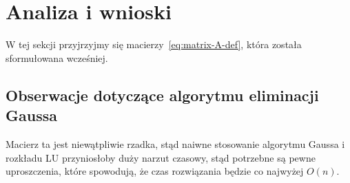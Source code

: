 \documentclass[../analysis.tex]{subfiles}
\begin{document}
  \section{Analiza i wnioski}

  W tej sekcji przyjrzyjmy się macierzy~\ref{eq:matrix-A-def}, 
  która została sformułowana wcześniej.

  \subsection{Obserwacje dotyczące algorytmu eliminacji Gaussa}

  Macierz ta jest niewątpliwie rzadka, stąd naiwne stosowanie
  algorytmu Gaussa i rozkładu LU przyniosłoby duży narzut
  czasowy, stąd potrzebne są pewne uproszczenia, które spowodują,
  że czas rozwiązania będzie co najwyżej \( O(n) \).
\end{document}
